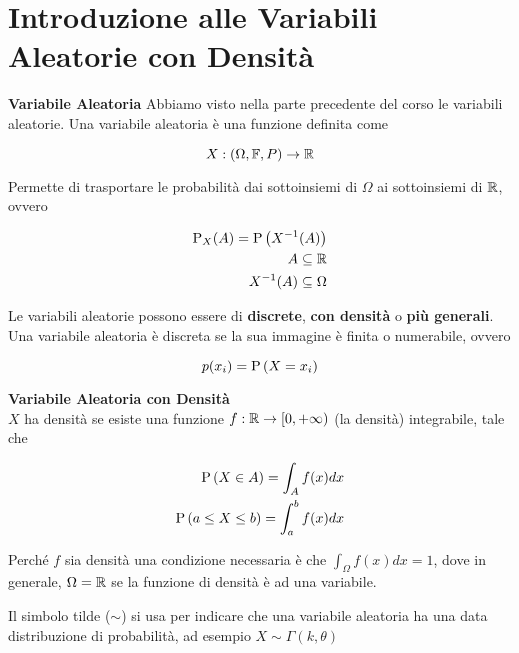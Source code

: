 \section{Introduzione alle Variabili Aleatorie con Densità}
\begin{defn}
    \textbf{Variabile Aleatoria}
    Abbiamo visto nella parte precedente del corso le variabili aleatorie. Una
    variabile aleatoria è una funzione definita come


    \begin{equation*}
        X: (\Omega, \mathbb{F}, P) \to \mathbb{R}
    \end{equation*}

    Permette di trasportare le probabilità dai sottoinsiemi di $ \Omega $ ai
    sottoinsiemi di $ \mathbb{R} $, ovvero


    \begin{equation*}
        \begin{aligned}
            \text{P}_X(A) = \text{P}\left(X^{-1} (A)\right) \\
            A \subseteq \mathbb{R} \\
            X^{-1}(A) \subseteq \Omega
        \end{aligned}
    \end{equation*}

    Le variabili aleatorie possono essere di \textbf{discrete}, \textbf{con
    densità} o \textbf{più generali}. Una variabile aleatoria è discreta se la
    sua immagine è finita o numerabile, ovvero


    \begin{equation*}
        p(x_i) = \text{P}\left(X=x_i\right)
    \end{equation*}
\end{defn}


\begin{defn}
    \label{defn:densita}
    \textbf{Variabile Aleatoria con Densità} \\
    $ X $ ha densità se esiste una funzione $ f : \mathbb{R} \to [0, +\infty) $ (la
    densità) integrabile, tale che

    \begin{equation*}
        \begin{aligned}
            \text{P}\left(X \in A\right) = \int_A f(x)dx \\
            \text{P}\left(a \leq X \leq b\right) = \int_a^b f(x)dx
        \end{aligned}
    \end{equation*}

    Perché $f$ sia densità una condizione necessaria è che $\int_{\Omega} f(x)
    dx = 1$, dove in generale, $\Omega = \mathbb{R}$ se la funzione di densità è ad una
    variabile.

    Il simbolo tilde ($\sim$) si usa per indicare che una variabile aleatoria ha una data
    distribuzione di probabilità, ad esempio $X \sim \Gamma(k, \theta)$
\end{defn}

